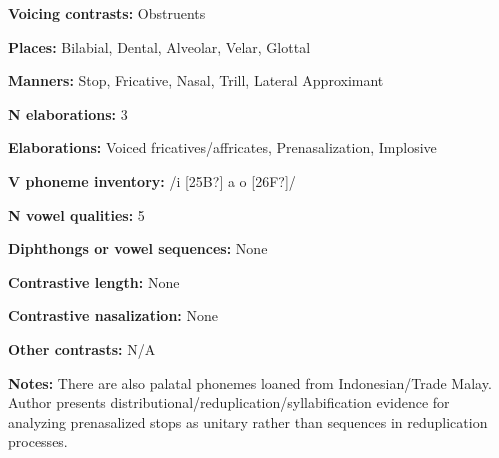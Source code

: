 \begin{styleBody}
\textbf{Voicing contrasts:} Obstruents
\end{styleBody}

\begin{styleBody}
\textbf{Places:} Bilabial, Dental, Alveolar, Velar, Glottal
\end{styleBody}

\begin{styleBody}
\textbf{Manners:} Stop, Fricative, Nasal, Trill, Lateral Approximant
\end{styleBody}

\begin{styleBody}
\textbf{N elaborations:} 3
\end{styleBody}

\begin{styleBody}
\textbf{Elaborations:} Voiced fricatives/affricates, Prenasalization, Implosive
\end{styleBody}

\begin{styleBody}
\textbf{V phoneme inventory:} /i [25B?] a o [26F?]/
\end{styleBody}

\begin{styleBody}
\textbf{N vowel qualities:} 5
\end{styleBody}

\begin{styleBody}
\textbf{Diphthongs or vowel sequences:} None
\end{styleBody}

\begin{styleBody}
\textbf{Contrastive length:} None
\end{styleBody}

\begin{styleBody}
\textbf{Contrastive nasalization:} None
\end{styleBody}

\begin{styleBody}
\textbf{Other contrasts:} N/A
\end{styleBody}

\begin{styleBody}
\textbf{Notes:} There are also palatal phonemes loaned from Indonesian/Trade Malay. Author presents distributional/reduplication/syllabification evidence for analyzing prenasalized stops as unitary rather than sequences in reduplication processes.
\end{styleBody}

